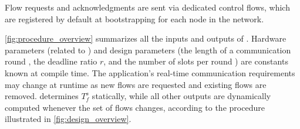 Flow requests and acknowledgments are sent via dedicated control flows, which are registered by default at bootstrapping for each node in the network.



\cref{fig:procedure_overview} summarizes all the inputs and outputs of \DRP.
Hardware parameters (related to \bolt) and design parameters (\ie the length of a communication round \rlength, the deadline ratio $r$, and the number of slots per round \nslotsmax) are constants known at compile time.
The application's real-time communication requirements may change at runtime as new flows are requested and existing flows are removed. \DRP determines $T_f^s$ statically, while all other outputs are dynamically computed whenever the set of flows changes, according to the procedure illustrated in \cref{fig:design_overview}.
